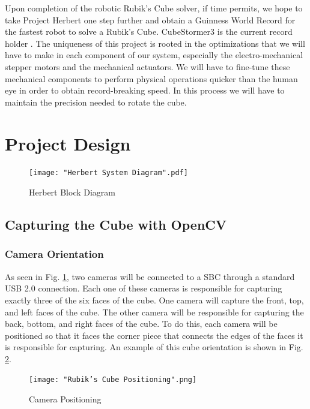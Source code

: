 \documentclass[11pt,english]{article}
\begin{document}
Upon completion of the robotic Rubik's Cube solver, if time permits, we hope to take Project Herbert one step further and obtain a Guinness World Record for the fastest robot to solve a Rubik's Cube. CubeStormer3 is the current record holder \cite{GuinnessWR}. The uniqueness of this project is rooted in the optimizations that we will have to make in each component of our system, especially the electro-mechanical stepper motors and the mechanical actuators. We will have to fine-tune these mechanical components to perform physical operations quicker than the human eye in order to obtain record-breaking speed. In this process we will have to maintain the precision needed to rotate the cube.

\section{Project Design}
\label{sec:Project Design}

\begin{figure}[!ht]
\centering
\texttt{[image: "Herbert System Diagram".pdf]}
\caption{Herbert Block Diagram}
\label{fig:System Block Diagram}
\end{figure}

\subsection{Capturing the Cube with OpenCV}
\label{sec:opencv}

\subsubsection{Camera Orientation}
As seen in Fig. \ref{fig:System Block Diagram}, two cameras will be connected to a SBC through a standard USB 2.0 connection. Each one of these cameras is responsible for capturing exactly three of the six faces of the cube. One camera will capture the front, top, and left faces of the cube. The other camera will be responsible for capturing the back, bottom, and right faces of the cube. To do this, each camera will be positioned so that it faces the corner piece that connects the edges of the faces it is responsible for capturing. An example of this cube orientation is shown in Fig. \ref{fig:Camera Positioning}.

\begin{figure}[!ht]
\centering
\texttt{[image: "Rubik's Cube Positioning".png]}
\caption{Camera Positioning}
\label{fig:Camera Positioning}
\end{figure}
\end{document}

